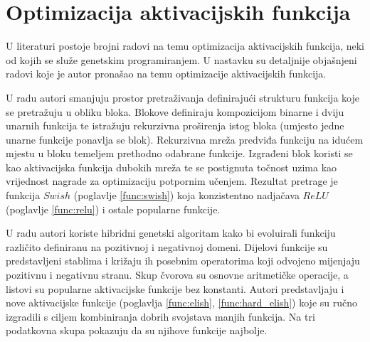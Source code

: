 \documentclass[times, utf8, numeric, diplomski]{fer}
\def\secref#1{(poglavlje \ref{#1})}
\def\TODO#1{\noindent\textcolor{red}{TODO: \textit{#1}}\newline}
\def\todo#1{\TODO{#1}}
\begin{document}
%

\section{Optimizacija aktivacijskih funkcija}
U literaturi postoje brojni radovi na temu optimizacija aktivacijskih funkcija, neki od kojih se služe genetskim programiranjem. U nastavku su detaljnije objašnjeni radovi koje je autor pronašao na temu optimizacije aktivacijskih funkcija.

U radu \citet{swish} autori smanjuju prostor pretraživanja definirajući strukturu funkcija koje se pretražuju u obliku bloka. Blokove definiraju kompozicijom binarne i dviju unarnih funkcija te istražuju rekurzivna proširenja istog bloka (umjesto jedne unarne funkcije ponavlja se blok). Rekurzivna mreža predviđa funkciju na idućem mjestu u bloku temeljem prethodno odabrane funkcije. Izgrađeni blok koristi se kao aktivacijska funkcija dubokih mreža te se postignuta točnost uzima kao vrijednost nagrade za optimizaciju potpornim učenjem. Rezultat pretrage je funkcija $Swish$ \secref{func:swish} koja konzistentno nadjačava $ReLU$ \secref{func:relu} i ostale popularne funkcije.

U radu \citet{elish} autori koriste hibridni genetski algoritam kako bi evoluirali funkciju različito definiranu na pozitivnoj i negativnoj domeni. Dijelovi funkcije su predstavljeni stablima i križaju ih posebnim operatorima koji odvojeno mijenjaju pozitivnu i negativnu stranu. Skup čvorova su osnovne aritmetičke operacije, a listovi su popularne aktivacijske funkcije bez konstanti. Autori predstavljaju i nove aktivacijske funkcije (poglavlja \ref{func:elish}, \ref{func:hard_elish}) koje su ručno izgradili s ciljem kombiniranja dobrih svojstava manjih funkcija. Na tri podatkovna skupa pokazuju da su njihove funkcije najbolje.
\end{document}
